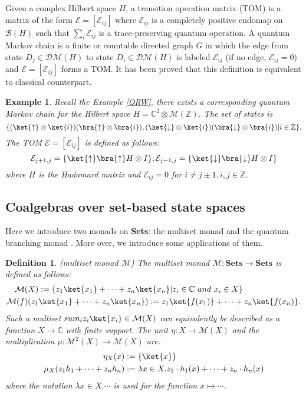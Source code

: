 \documentclass[a4paper, 11pt]{article}
\newtheorem{definition}{Definition}
\newtheorem{example}{Example}
\begin{document}
Given a complex Hilbert space $H$, a transition operation matrix (TOM) is a matrix of the form $\mathcal{E}=[\mathcal{E}_{ij}]$ where $\mathcal{E}_{ij}$ is a completely positive endomap on $\mathcal{B}(H)$ such that $\sum_i\mathcal{E}_{ij}$ is a trace-preserving quantum operation. A quantum Markov chain is a finite or countable directed graph $G$ in which the edge from state $D_j\in \mathcal{DM}(H)$ to state $D_i\in \mathcal{DM}(H)$ is labeled $\mathcal{E}_{ij}$ (if no edge, $\mathcal{E}_{ij}=0$) and $\mathcal{E}=[\mathcal{E}_{ij}]$ forms a TOM. It has been proved that this definition is equivalent to classical counterpart. 

\begin{example}
Recall the Example \ref{QRW}, there exists a corresponding quantum Markov chain for the Hilbert space $H=\mathbb{C}^2\otimes \mathcal{M}(\mathbb{Z})$. The set of states is $$\{(\ket{\uparrow}\otimes\ket{i})(\bra{\uparrow}\otimes\bra{i}),(\ket{\downarrow}\otimes\ket{i})(\bra{\downarrow}\otimes\bra{i})|i\in \mathbb{Z}\}.$$
The TOM $\mathcal{E}=[\mathcal{E}_{ij}]$ is defined as follows:
$$\mathcal{E}_{j+1,j}=\{\ket{\uparrow}\bra{\uparrow}H\otimes I\}, \mathcal{E}_{j-1,j}=\{\ket{\downarrow}\bra{\downarrow}H\otimes I\}$$
where $H$ is the Hadamard matrix and $\mathcal{E}_{ij}=0$ for $i\neq j\pm 1, i,j\in\mathbb{Z}$. 
\end{example}

\subsection{Coalgebras over set-based state spaces}
Here we introduce two monads on \textbf{Sets}: the multiset monad \cite{B11} and the quantum branching monad \cite{hasuo17,ogawa14}. More over, we introduce some applications of them. 

\begin{definition}(multiset monad $\mathcal{M}$)
 The multiset monad $\mathcal{M}:\textbf{Sets}\rightarrow \textbf{Sets}$ is defined as follows:
 $$ 
 \begin{aligned}
 \mathcal{M}(X)&:=\{z_1\ket{x_1}+\dots+z_n\ket{x_n}|z_i\in \mathbb{C} \ and\ x_i\in X\}\\
 \mathcal{M}(f)(z_1&\ket{x_1}+\dots+z_n\ket{x_n}):=z_1\ket{f(x_1)}+\dots+z_n\ket{f(x_n)}.
 \end{aligned}
 $$
 Such a multiset $sum_i z_i\ket{x_i}\in\mathcal{M}(X)$ can equivalently be described as a function $X\rightarrow \mathbb{C}$ with finite support.
 The unit $\eta:X\rightarrow \mathcal{M}(X)$ and the multiplication $\mu:\mathcal{M}^2(X)\rightarrow \mathcal{M}(X)$ are:
 $$
 \begin{aligned}
 \eta_X(x)&:=\{\ket{x}\}\\
 \mu_X(z_1h_1+\dots+z_n h_n)&:=\lambda x\in X. z_1\cdot h_1(x)+\dots+z_n\cdot h_n(x)
 \end{aligned}
 $$
 where the notation $\lambda x\in X.\cdots$ is used for the function $x\mapsto \cdots$.
\end{definition}
\end{document}
